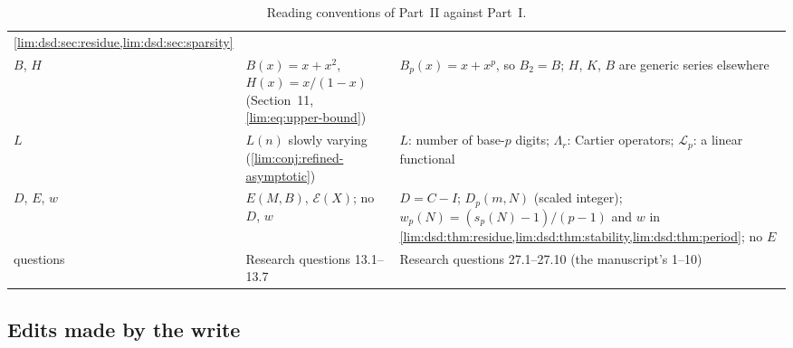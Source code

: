 \documentclass[11pt]{article}
\theoremstyle{definition}
\theoremstyle{remark}
\newcommand{\Lfun}{\mathcal L_p}
\begin{document}
\begin{table}[htbp]
\begin{tabular}{@{}>{\raggedright\arraybackslash}p{}>{\raggedright\arraybackslash}p{}>{\raggedright\arraybackslash}p{}@{}}
\cref{lim:dsd:sec:residue,lim:dsd:sec:sparsity}\\
$B$, $H$ & $B(x)=x+x^2$, $H(x)=x/(1-x)$ (Section~11, \eqref{lim:eq:upper-bound}) &
$B_p(x)=x+x^p$, so $B_2=B$; $H$, $K$, $B$ are generic series elsewhere\\
$L$ & $L(n)$ slowly varying (\cref{lim:conj:refined-asymptotic}) &
$L$: number of base-$p$ digits; $\Lambda_r$: Cartier operators;
$\Lfun$: a linear functional\\
$D$, $E$, $w$ & $E(M,B)$, $\mathcal E(X)$; no $D$, $w$ & $D=C-I$;
$D_p(m,N)$ (scaled integer); $w_p(N)=(s_p(N)-1)/(p-1)$ and $w$ in
\cref{lim:dsd:thm:residue,lim:dsd:thm:stability,lim:dsd:thm:period}; no $E$\\
questions & Research questions 13.1--13.7 & Research questions
27.1--27.10 (the manuscript's 1--10)\\
\bottomrule
\end{tabular}
\caption{Reading conventions of Part~II against Part~I.}
\label{lim:dsd:tab:notation}
\end{table}

\subsection{Edits made by the write}
\label{lim:dsd:sec:edits}
\end{document}
